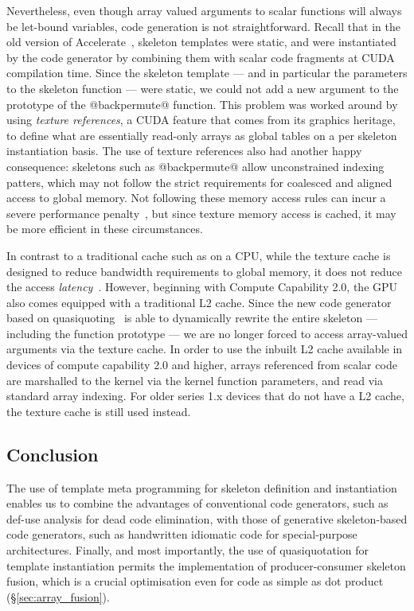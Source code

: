 Nevertheless, even though array valued arguments to scalar functions will always
be let-bound variables, code generation is not straightforward. Recall that in
the old version of Accelerate~\cite{Chakravarty:2011fr}, skeleton templates were
static, and were instantiated by the code generator by combining them with
scalar code fragments at CUDA compilation time. Since the skeleton template ---
and in particular the parameters to the skeleton function --- were static, we
could not add a new argument to the prototype of the @backpermute@ function.
This problem was worked around by using \emph{texture references}, a CUDA
feature that comes from its graphics heritage, to define what are essentially
read-only arrays as global tables on a per skeleton instantiation basis. The use
of texture references also had another happy consequence: skeletons such as
@backpermute@ allow unconstrained indexing patters, which may not follow the
strict requirements for coalesced and aligned access to global memory. Not
following these memory access rules can incur a severe performance
penalty~\cite{NVIDIA:2012wf}, but since texture memory access is cached, it may
be more efficient in these circumstances.

In contrast to a traditional cache such as on a CPU, while the texture cache is
designed to reduce bandwidth requirements to global memory, it does not reduce
the access \emph{latency}~\cite[\S5.3.2]{NVIDIA:2012wf}. However, beginning with
Compute Capability 2.0, the GPU also comes equipped with a traditional L2 cache.
Since the new code generator based on quasiquoting~\cite{CliftonEverest:2014vi}
is able to dynamically rewrite the entire skeleton --- including the function
prototype --- we are no longer forced to access array-valued arguments via the
texture cache. In order to use the inbuilt L2 cache available in devices of
compute capability 2.0 and higher, arrays referenced from scalar code are
marshalled to the kernel via the kernel function parameters, and read via
standard array indexing. For older series 1.x devices that do not have a L2
cache, the texture cache is still used instead.


\subsection{Conclusion}

The use of template meta programming for skeleton definition and instantiation
enables us to combine the advantages of conventional code generators, such as
def-use analysis for dead code elimination, with those of generative
skeleton-based code generators, such as handwritten idiomatic code for
special-purpose architectures. Finally, and most importantly, the use of
quasiquotation for template instantiation permits the implementation of
producer-consumer skeleton fusion, which is a crucial optimisation even for code
as simple as dot product (\S\ref{sec:array_fusion}).


